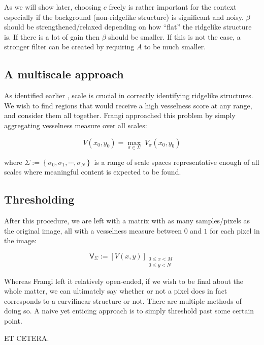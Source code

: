 As we will show later, choosing $c$ freely is rather important for the context especially if the background (non-ridgelike structure) is significant and noisy. $\beta$ should be strengthened/relaxed depending on how ``flat'' the ridgelike structure is. If there is a lot of gain  then $\beta$ should be smaller. If this is not the case, a stronger filter can be created by requiring $A$ to be much smaller.

\subsection{A multiscale approach}

As identified earlier , scale is crucial in correctly identifying ridgelike structures. We wish to find regions that would receive a high vesselness score at any range, and consider them all together. Frangi \cite{frangi1998multiscale} approached this problem by simply aggregating vesselness measure over all scales:

\begin{equation} \label{frangi-vesselness-max}
V(x_0, y_0) = \underset{\sigma \in \Sigma}{\max}\;  V_\sigma(x_0, y_0)
\end{equation}

where $\Sigma := \left\{ \sigma_0, \sigma_1 , \cdots, \sigma_N \right\}$ is a range of scale spaces representative enough of all scales where meaningful content is expected to be found.

\subsection{Thresholding}

After this procedure, we are left with a matrix with as many samples/pixels as the original image, all with a vesselness measure between $0$ and $1$ for each pixel in the image:

\begin{equation} \label{eq:frangi-max-matrix}
\mathsf{V}_\Sigma := \left[ V(x, y)\right]_{\substack{0\le x<M \\ 0\le y<N}}
\end{equation}

Whereas Frangi \cite{frangi1998multiscale} left it relatively open-ended, if we wish to be final about the whole matter, we can ultimately say whether or not a pixel does in fact corresponds to a curvilinear structure or not. There are multiple methods of doing so. A naive yet enticing approach is to simply threshold past some certain point.

ET CETERA. 









